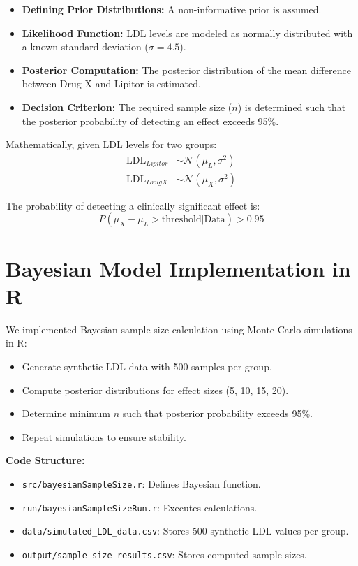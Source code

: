 \documentclass{article}
\begin{document}
	\begin{itemize}
		\item \textbf{Defining Prior Distributions:} A non-informative prior is assumed.
		\item \textbf{Likelihood Function:} LDL levels are modeled as normally distributed with a known standard deviation ($\sigma = 4.5$).
		\item \textbf{Posterior Computation:} The posterior distribution of the mean difference between Drug X and Lipitor is estimated.
		\item \textbf{Decision Criterion:} The required sample size ($n$) is determined such that the posterior probability of detecting an effect exceeds 95\%.
	\end{itemize}
	
	Mathematically, given LDL levels for two groups:
	\begin{align*}
		\text{LDL}_{Lipitor} &\sim \mathcal{N}(\mu_L, \sigma^2) \\
		\text{LDL}_{DrugX} &\sim \mathcal{N}(\mu_X, \sigma^2)
	\end{align*}
	
	The probability of detecting a clinically significant effect is:
	\begin{equation}
		P(\mu_X - \mu_L > \text{threshold} | \text{Data}) > 0.95
	\end{equation}
	
	\section{Bayesian Model Implementation in R}
	We implemented Bayesian sample size calculation using Monte Carlo simulations in R:
	\begin{itemize}
		\item Generate synthetic LDL data with 500 samples per group.
		\item Compute posterior distributions for effect sizes (5, 10, 15, 20).
		\item Determine minimum $n$ such that posterior probability exceeds 95\%.
		\item Repeat simulations to ensure stability.
	\end{itemize}
	
	\textbf{Code Structure:}
	\begin{itemize}
		\item \texttt{src/bayesianSampleSize.r}: Defines Bayesian function.
		\item \texttt{run/bayesianSampleSizeRun.r}: Executes calculations.
		\item \texttt{data/simulated\_LDL\_data.csv}: Stores 500 synthetic LDL values per group.
		\item \texttt{output/sample\_size\_results.csv}: Stores computed sample sizes.
	\end{itemize}
	
\end{document}
